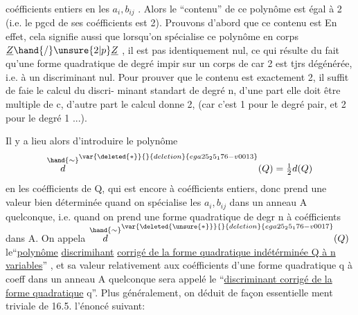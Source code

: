 
coéfficients entiers en les $a_i,b_{ij}$ . Alors le ``contenu'' de ce polynôme
est égal à 2 (i.e. le pgcd de ses coéfficients est 2).
 Prouvons d'abord que ce contenu est 
En effet, cela signifie aussi que  lorsqu'on spécialise ce polynôme
en  corps $\underline{Z}\hand{/}\unsure{2|p}\underline{Z}$\hand{)} , il est pas identiquement nul, ce qui 
résulte du fait qu'une forme quadratique de degré impir sur un corps de
car 2 est tjrs dégénérée, i.e. à un discriminant nul. Pour prouver
que le contenu  est exactement 2, il suffit de faie le calcul du discri-%
minant  standart de degré n, d'une part elle doit être multiple de c,
d'autre part le calcul donne 2, (car c'est 1 pour le degré pair, et 2 pour
le degré 1 ...).

 Il y a lieu alors d'introduire le polynôme
\[ \overset{\hand{\sim}}{d}^{\var{\deleted{*}}{}{deletion}{ega25_25_176-v0013}}(Q) = \tfrac{1}{2}d(Q) \]
en les coéfficients de Q, qui est encore à coéfficients entiers, donc
prend une valeur bien déterminée quand on spécialise les $a_i,b_{ij}$ dans un
anneau A quelconque, i.e. quand on prend une forme quadratique  de degr
n à coéfficients dans A. On appela $\overset{\hand{\sim}}{d}^{\var{\deleted{\unsure{*}}}{}{deletion}{ega25_25_176-v0017}}(Q)$ le``\uline{polynôme} \uline{discrimihant}
\uline{corrigé de la forme quadratique indétérminée Q à n variables}'' , et sa
valeur relativement aux coéfficients d'une forme quadratique q à coeff
dans un anneau A quelconque sera appelé le ``\uline{discriminant corrigé de la}
\uline{forme quadratique} q''. Plus généralement, on déduit de façon essentielle
ment triviale de 16.5. l'énoncé suivant:

